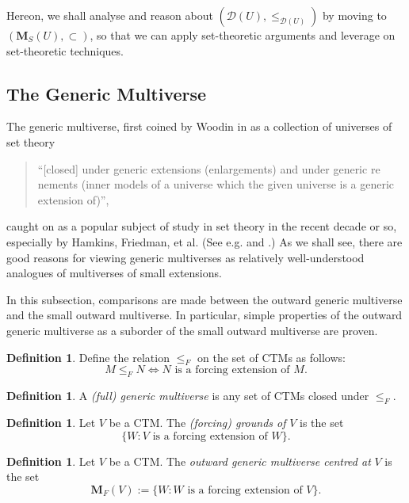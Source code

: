 \documentclass[12pt, twoside]{memoir}
\numberwithin{equation}{section}
\theoremstyle{definition}
\newtheorem{defi}[thm]{Definition}
\theoremstyle{remark}
\theoremstyle{definition}
\theoremstyle{definition}
\theoremstyle{definition}
\theoremstyle{remark}
\begin{document}
Hereon, we shall analyse and reason about $(\mathcal{D}(U), \leq_{\mathcal{D}(U)})$ by moving to $(\mathbf{M}_S(U), \subset)$, so that we can apply set-theoretic arguments and leverage on set-theoretic techniques.

\subsection{The Generic Multiverse}\label{genmul}

The generic multiverse, first coined by Woodin in \cite{woodingen} as a collection of universes of set theory 
\begin{quote}
    ``[closed] under generic extensions (enlargements) and under generic re nements (inner models of a universe which the given universe is a generic extension of)'',
\end{quote}
caught on as a popular subject of study in set theory in the recent decade or so, especially by Hamkins, Friedman, et al. (See e.g. \cite{hamkinsmoving} and \cite{sygeneric}.) As we shall see, there are good reasons for viewing generic multiverses as relatively well-understood analogues of multiverses of small extensions.

In this subsection, comparisons are made between the outward generic multiverse and the small outward multiverse. In particular, simple properties of the outward generic multiverse as a suborder of the small outward multiverse are proven.

\begin{defi}
Define the relation $\leq_F$ on the set of CTMs as follows:
\begin{equation*}
    M \leq_F N \iff N \text{ is a forcing extension of } M \text{.}
\end{equation*}
\end{defi}

\begin{defi}
A \emph{(full) generic multiverse} is any set of CTMs closed under $\leq_F$.
\end{defi}

\begin{defi}
Let $V$ be a CTM. The \emph{(forcing) grounds of} $V$ is the set
\begin{equation*}
    \{W : V \text{ is a forcing extension of } W\} \text{.}
\end{equation*}
\end{defi}

\begin{defi}
Let $V$ be a CTM. The \emph{outward generic multiverse centred at} $V$ is the set
\begin{equation*}
    \mathbf{M}_F(V) := \{W : W \text{ is a forcing extension of } V\} \text{.}
\end{equation*}
\end{defi} 
\end{document}
